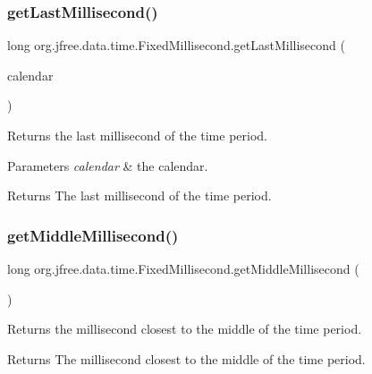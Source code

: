 \subsubsection{\texorpdfstring{get\+Last\+Millisecond()}{getLastMillisecond()}\hspace{0.1cm}{\footnotesize\ttfamily [2/2]}}
{\footnotesize\ttfamily long org.\+jfree.\+data.\+time.\+Fixed\+Millisecond.\+get\+Last\+Millisecond (\begin{DoxyParamCaption}\item[{Calendar}]{calendar }\end{DoxyParamCaption})}

Returns the last millisecond of the time period.


\begin{DoxyParams}{Parameters}
{\em calendar} & the calendar.\\
\hline
\end{DoxyParams}
\begin{DoxyReturn}{Returns}
The last millisecond of the time period. 
\end{DoxyReturn}
\mbox{\label{classorg_1_1jfree_1_1data_1_1time_1_1_fixed_millisecond_a4b2079c6950b1c169474f5d161a3b4f1}} 
\subsubsection{\texorpdfstring{get\+Middle\+Millisecond()}{getMiddleMillisecond()}\hspace{0.1cm}{\footnotesize\ttfamily [1/2]}}
{\footnotesize\ttfamily long org.\+jfree.\+data.\+time.\+Fixed\+Millisecond.\+get\+Middle\+Millisecond (\begin{DoxyParamCaption}{ }\end{DoxyParamCaption})}

Returns the millisecond closest to the middle of the time period.

\begin{DoxyReturn}{Returns}
The millisecond closest to the middle of the time period. 
\end{DoxyReturn}
\mbox{\label{classorg_1_1jfree_1_1data_1_1time_1_1_fixed_millisecond_aa8df306db6a1066dea4d3e5741e2871f}} 

